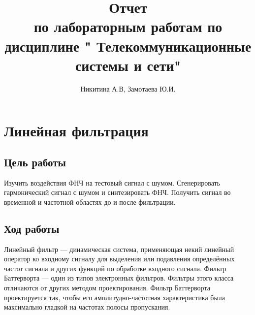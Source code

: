 \documentclass[10pt,a4paper]{article}
\author{Никитина А.В, Замотаева Ю.И.}
\title{Отчет\\ по лабораторным работам по дисциплине " Телекоммуникационные системы и сети"}
\begin{document}
\maketitle
\pagebreak
\tableofcontents
\pagebreak

\section{Линейная фильтрация}
\subsection{Цель работы}
Изучить воздействия ФНЧ на тестовый сигнал с шумом. Сгенерировать гармонический сигнал с шумом и синтезировать ФНЧ. Получить сигнал во временной и частотной областях до и после фильтрации.
\subsection{Ход работы}
Линейный фильтр — динамическая система, применяющая некий линейный оператор ко входному сигналу для выделения или подавления определённых частот сигнала и других функций по обработке входного сигнала. 
Фильтр Баттерворта — один из типов электронных фильтров. Фильтры этого класса отличаются от других методом проектирования. Фильтр Баттерворта проектируется так, чтобы его амплитудно-частотная характеристика была максимально гладкой на частотах полосы пропускания. 
\end{document}
